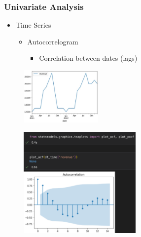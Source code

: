 \begin{frame}\frametitle{Univariate Analysis}
   \begin{minipage}{0.48\linewidth}
      \begin{itemize}
         \item Time Series
         \begin{itemize}
            \item Autocorrelogram
            \begin{itemize}
               \item Correlation between dates (lags)
            \end{itemize}
         \end{itemize}
      \end{itemize}
      \vspace{.5cm}
      \begin{figure}[H]
         \includegraphics[width=4cm]{../images/illustrations/pattern_graph_time_series.jpg}
      \end{figure}
   \end{minipage}
   \begin{minipage}{0.48\linewidth}
      \begin{figure}[H]
         \includegraphics[width=6cm]{../images/illustrations/pattern_graph_autocorrelation.png}
      \end{figure}
   \end{minipage}
\end{frame}






